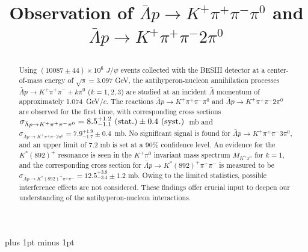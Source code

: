 \documentclass[prd,aps,reprint,noeprint,superscriptaddress,amsmath, amssymb]{revtex4-1}
\begin{document}
\normalsize
\parskip=5pt plus 1pt minus 1pt



\title{
    \boldmath  Observation of $\bar{\Lambda}p\to K^{+}\pi^{+}\pi^{-}\pi^{0}$ and $\bar{\Lambda}p\to K^{+}\pi^{+}\pi^{-}2\pi^{0}$

}



\author{}

\begin{abstract}
    Using $(10087 \pm 44) \times 10^6$ $J/\psi$ events collected with the BESIII detector at a center-of-mass energy of $\sqrt{s}=3.097$ GeV,
    the antihyperon-nucleon annihilation processes $\bar{\Lambda} p \to K^+ \pi^+ \pi^- + k\pi^0$ ($k=1,2,3$)
    are studied at an incident $\bar{\Lambda}$ momentum of approximately 1.074~GeV/$c$.
    The reactions $\bar{\Lambda} p \to K^+ \pi^+ \pi^- \pi^0$ and $\bar{\Lambda} p \to K^+ \pi^+ \pi^- 2\pi^0$ are observed for the first time,
    with corresponding cross sections $\sigma_{\bar{\Lambda} p \to K^+ \pi^+ \pi^- \pi^0} = 8.5^{+1.2}_{-1.1}~(\rm{stat.}) \pm 0.4~ (\rm {syst.})$~mb
    and $\sigma_{\bar{\Lambda} p \to K^+ \pi^+ \pi^- 2\pi^0} = 7.9^{+1.9}_{-1.7} \pm 0.4$~mb.
    No significant signal is found for $\bar{\Lambda} p \to K^+ \pi^+ \pi^- 3\pi^0$, and an upper limit of 7.2 mb is set at a 90\% confidence level.
    An evidence for the $K^{*}(892)^+$ resonance is seen in the $K^+\pi^0$ invariant mass spectrum $M_{K^+\pi^0}$ for $k=1$,
    and the corresponding cross section for $\bar{\Lambda} p \to K^{*}(892)^+ \pi^+ \pi^-$ is measured to be
    $\sigma_{\bar{\Lambda} p \to K^{*}(892)^+ \pi^+ \pi^-} = 12.5^{+3.8}_{-3.4} \pm 1.2$ mb.
    Owing to the limited statistics, possible interference effects are not considered.
    These findings offer crucial input to deepen our understanding of the antihyperon-nucleon interactions.
\end{abstract}

\maketitle
\end{document}
